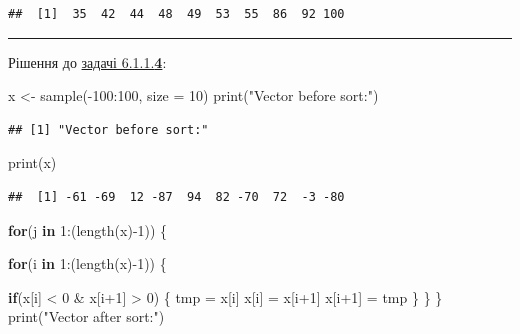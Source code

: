\documentclass[
]{book}
\newenvironment{Shaded}{\begin{snugshade}}{\end{snugshade}}
\newcommand{\AttributeTok}[1]{\textcolor[rgb]{0.77,0.63,0.00}{#1}}
\newcommand{\ControlFlowTok}[1]{\textcolor[rgb]{0.13,0.29,0.53}{\textbf{#1}}}
\newcommand{\DecValTok}[1]{\textcolor[rgb]{0.00,0.00,0.81}{#1}}
\newcommand{\FunctionTok}[1]{\textcolor[rgb]{0.00,0.00,0.00}{#1}}
\newcommand{\NormalTok}[1]{#1}
\newcommand{\OtherTok}[1]{\textcolor[rgb]{0.56,0.35,0.01}{#1}}
\newcommand{\SpecialCharTok}[1]{\textcolor[rgb]{0.00,0.00,0.00}{#1}}
\newcommand{\StringTok}[1]{\textcolor[rgb]{0.31,0.60,0.02}{#1}}
\begin{document}
\begin{verbatim}
##  [1]  35  42  44  48  49  53  55  86  92 100
\end{verbatim}

\begin{center}\rule{0.5\linewidth}{0.5pt}\end{center}

Рішення до \protect\hyperlink{task6114}{задачі 6.1.1.\textbf{4}}:

\begin{Shaded}
\begin{Highlighting}[]
\NormalTok{x }\OtherTok{\textless{}{-}} \FunctionTok{sample}\NormalTok{(}\SpecialCharTok{{-}}\DecValTok{100}\SpecialCharTok{:}\DecValTok{100}\NormalTok{, }\AttributeTok{size =} \DecValTok{10}\NormalTok{)}
\FunctionTok{print}\NormalTok{(}\StringTok{"Vector before sort:"}\NormalTok{)}
\end{Highlighting}
\end{Shaded}

\begin{verbatim}
## [1] "Vector before sort:"
\end{verbatim}

\begin{Shaded}
\begin{Highlighting}[]
\FunctionTok{print}\NormalTok{(x)}
\end{Highlighting}
\end{Shaded}

\begin{verbatim}
##  [1] -61 -69  12 -87  94  82 -70  72  -3 -80
\end{verbatim}

\begin{Shaded}
\begin{Highlighting}[]
\ControlFlowTok{for}\NormalTok{(j }\ControlFlowTok{in} \DecValTok{1}\SpecialCharTok{:}\NormalTok{(}\FunctionTok{length}\NormalTok{(x)}\SpecialCharTok{{-}}\DecValTok{1}\NormalTok{)) \{}
  
  \ControlFlowTok{for}\NormalTok{(i }\ControlFlowTok{in} \DecValTok{1}\SpecialCharTok{:}\NormalTok{(}\FunctionTok{length}\NormalTok{(x)}\SpecialCharTok{{-}}\DecValTok{1}\NormalTok{)) \{}
    
    \ControlFlowTok{if}\NormalTok{(x[i] }\SpecialCharTok{\textless{}} \DecValTok{0} \SpecialCharTok{\&}\NormalTok{ x[i}\SpecialCharTok{+}\DecValTok{1}\NormalTok{] }\SpecialCharTok{\textgreater{}} \DecValTok{0}\NormalTok{) \{}
\NormalTok{      tmp }\OtherTok{=}\NormalTok{ x[i]}
\NormalTok{      x[i] }\OtherTok{=}\NormalTok{ x[i}\SpecialCharTok{+}\DecValTok{1}\NormalTok{]}
\NormalTok{      x[i}\SpecialCharTok{+}\DecValTok{1}\NormalTok{] }\OtherTok{=}\NormalTok{ tmp}
\NormalTok{    \}}
\NormalTok{  \}}
\NormalTok{\}}
\FunctionTok{print}\NormalTok{(}\StringTok{"Vector after sort:"}\NormalTok{)}
\end{Highlighting}
\end{Shaded}
\end{document}
